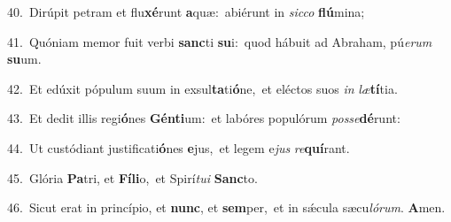 {\numbfont\textcolor{\numbcolor}{40.}}~Dirúpit petram et flu\-\textbf{xé}\-runt \textbf{a}\-quæ:~\star abiérunt in \textit{sic}\-\textit{co} \textbf{flú}\-mina;\par
{\numbfont\textcolor{\numbcolor}{41.}}~Quóniam memor fuit verbi \textbf{sanc}\-ti \textbf{su}\-i:~\star quod hábuit ad Abraham, pú\-\textit{e}\-\textit{rum} \textbf{su}\-um.\par
{\numbfont\textcolor{\numbcolor}{42.}}~Et edúxit pópulum suum in exsul\-\textbf{ta}\-ti\-\textbf{ó}\-ne,~\star et eléctos suos \textit{in} \textit{læ}\-\textbf{tí}tia.\par
{\numbfont\textcolor{\numbcolor}{43.}}~Et dedit illis regi\-\textbf{ó}\-nes \textbf{Gén}\-\textbf{ti}um:~\star et labóres populórum \textit{pos}\-\textit{se}\textbf{dé}runt:\par
{\numbfont\textcolor{\numbcolor}{44.}}~Ut custódiant justificati\-\textbf{ó}\-nes \textbf{e}\-jus,~\star et legem e\textit{jus} \textit{re}\-\textbf{quí}rant.\par
{\numbfont\textcolor{\numbcolor}{45.}}~Glória \textbf{Pa}\-tri, et \textbf{Fí}\-\textbf{li}o,~\star et Spirí\-\textit{tu}\-\textit{i} \textbf{Sanc}\-to.\par
{\numbfont\textcolor{\numbcolor}{46.}}~Sicut erat in princípio, et \textbf{nunc}\-, et \textbf{sem}\-per,~\star et in sǽcula sæcu\-\textit{ló}\-\textit{rum}. \textbf{A}\-men.\par
